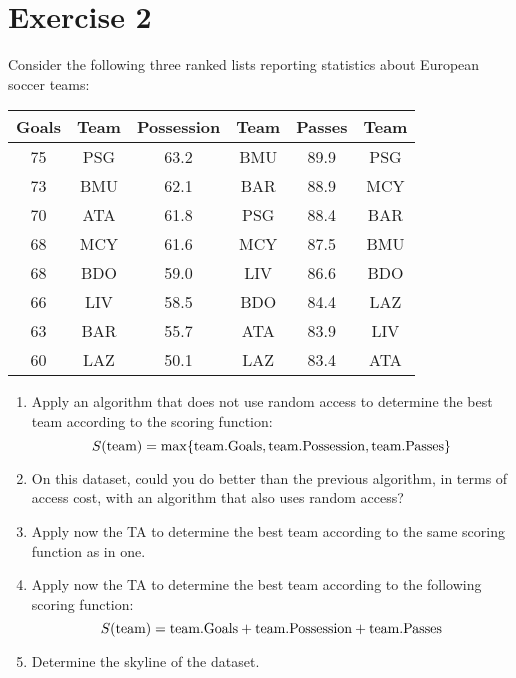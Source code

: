\section{Exercise 2}

Consider the following three ranked lists reporting statistics about European soccer teams: 
\begin{table}[H]
    \centering
    \begin{tabular}{|cc|cc|cc|}
    \hline
    \textbf{Goals} & \textbf{Team} & \textbf{Possession} & \textbf{Team} & \textbf{Passes} & \textbf{Team} \\ \hline
    75         & PSG      & 63.2         & BMU      & 89.9         & PSG      \\
    73         & BMU      & 62.1         & BAR      & 88.9         & MCY      \\
    70         & ATA      & 61.8         & PSG      & 88.4         & BAR      \\
    68         & MCY      & 61.6         & MCY      & 87.5         & BMU      \\
    68         & BDO      & 59.0         & LIV      & 86.6         & BDO      \\
    66         & LIV      & 58.5         & BDO      & 84.4         & LAZ      \\
    63         & BAR      & 55.7         & ATA      & 83.9         & LIV      \\
    60         & LAZ      & 50.1         & LAZ      & 83.4         & ATA      \\ \hline
    \end{tabular}
\end{table}
\begin{enumerate}
    \item Apply an algorithm that does not use random access to determine the best team according to the scoring function:
        \[S(\textnormal{team})=\max\{\textnormal{team.Goals},\textnormal{team.Possession},\textnormal{team.Passes}\}\]
    \item On this dataset, could you do better than the previous algorithm, in terms of access cost, with an algorithm that also uses random access? 
    \item Apply now the TA to determine the best team according to the same scoring function as in one. 
    \item Apply now the TA to determine the best team according to the following scoring function:
        \[S(\textnormal{team}) = \textnormal{team.Goals} + \textnormal{team.Possession} + \textnormal{team.Passes}\]
    \item Determine the skyline of the dataset. 
\end{enumerate}

